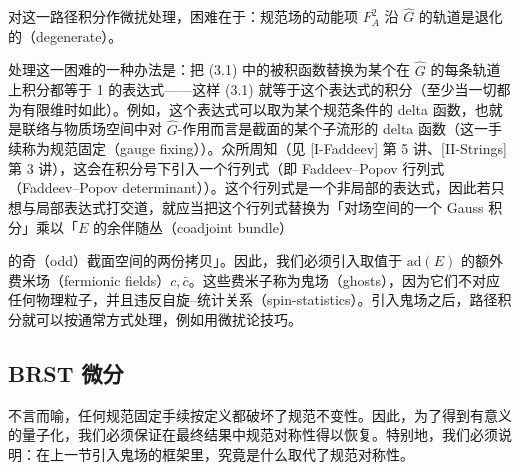 对这一路径积分作微扰处理，困难在于：规范场的动能项 $F_A^2$ 沿 $\widehat{G}$ 的轨道是退化的（degenerate）。


处理这一困难的一种办法是：把 (3.1) 中的被积函数替换为某个在 $\widehat{G}$ 的每条轨道上积分都等于 1 的表达式——这样 (3.1) 就等于这个表达式的积分（至少当一切都为有限维时如此）。例如，这个表达式可以取为某个规范条件的 delta 函数，也就是联络与物质场空间中对 $\widehat{G}$-作用而言是截面的某个子流形的 delta 函数（这一手续称为规范固定（gauge fixing））。众所周知（见 [I-Faddeev] 第 5 讲、[II-Strings] 第 3 讲），这会在积分号下引入一个行列式（即 Faddeev–Popov 行列式（Faddeev–Popov determinant））。这个行列式是一个非局部的表达式，因此若只想与局部表达式打交道，就应当把这个行列式替换为「对场空间的一个 Gauss 积分」乘以「$E$ 的余伴随丛（coadjoint bundle）

\par\medskip
{}
\par\medskip

的奇（odd）截面空间的两份拷贝」。因此，我们必须引入取值于 $\mathrm{ad}(E)$ 的额外费米场（fermionic fields）$c,\bar c$。这些费米子称为鬼场（ghosts），因为它们不对应任何物理粒子，并且违反自旋–统计关系（spin-statistics）。引入鬼场之后，路径积分就可以按通常方式处理，例如用微扰论技巧。


\subsection{BRST 微分}

不言而喻，任何规范固定手续按定义都破坏了规范不变性。因此，为了得到有意义的量子化，我们必须保证在最终结果中规范对称性得以恢复。特别地，我们必须说明：在上一节引入鬼场的框架里，究竟是什么取代了规范对称性。

